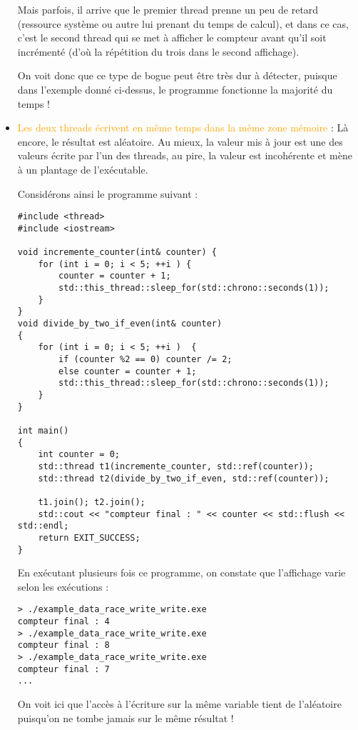 \documentclass[fleqn,11pt]{article}
\begin{document}
\begin{itemize}
Mais parfois, il arrive que le premier thread prenne un peu de retard (ressource système ou autre lui prenant du temps de calcul), et dans ce cas, c'est le second thread qui se met à afficher le compteur avant qu'il soit
incrémenté (d'où la répétition du trois dans le second affichage).

On voit donc que ce type de bogue peut être très dur à détecter, puisque dans l'exemple donné ci-dessus,
le programme fonctionne la majorité du temps !

\item \textcolor{orange}{Les deux threads écrivent en même temps dans la même zone mémoire} : Là encore, le résultat est aléatoire. Au mieux, la valeur mis à jour est une des valeurs écrite par l'un des threads, au pire, la valeur est incohérente et mène à un plantage de l'exécutable.

Considérons ainsi le programme suivant :
\begin{lstlisting}
#include <thread>
#include <iostream>

void incremente_counter(int& counter) {
    for (int i = 0; i < 5; ++i ) {
        counter = counter + 1;
        std::this_thread::sleep_for(std::chrono::seconds(1));
    }
}
void divide_by_two_if_even(int& counter)
{
    for (int i = 0; i < 5; ++i )  {
        if (counter %2 == 0) counter /= 2;
        else counter = counter + 1;
        std::this_thread::sleep_for(std::chrono::seconds(1));
    }
}

int main()
{
    int counter = 0;
    std::thread t1(incremente_counter, std::ref(counter));
    std::thread t2(divide_by_two_if_even, std::ref(counter));

    t1.join(); t2.join();
    std::cout << "compteur final : " << counter << std::flush << std::endl;
    return EXIT_SUCCESS;    
}
\end{lstlisting}
En exécutant plusieurs fois ce programme, on constate que l'affichage varie selon les exécutions :
\begin{verbatim}
> ./example_data_race_write_write.exe
compteur final : 4
> ./example_data_race_write_write.exe
compteur final : 8
> ./example_data_race_write_write.exe
compteur final : 7
...
\end{verbatim}

On voit ici que l'accès à l'écriture sur la même variable tient de l'aléatoire puisqu'on ne tombe jamais sur le même résultat !
\end{itemize}
\end{document}
